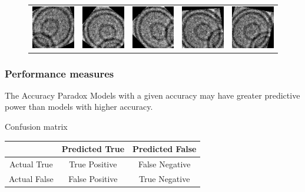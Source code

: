 \documentclass{beamer}
\begin{document}
\begin{frame}
\begin{figure}
\begin{tabular}{ccccc}
\includegraphics[scale=0.5]{augmented/_0_7140.jpeg} & \includegraphics[scale=0.5]{augmented/_0_7746.jpeg} & \includegraphics[scale=0.5]{augmented/_0_8553.jpeg} & \includegraphics[scale=0.5]{augmented/_0_8763.jpeg} & \includegraphics[scale=0.5]{augmented/_0_9361.jpeg} 
	
\end{tabular}
\end{figure}
\end{frame}

%
%

\begin{frame}
\frametitle{Performance measures}

\begin{block}{The Accuracy Paradox}
Models with a given accuracy may have greater predictive power than models with higher accuracy.
\end{block}

\begin{block}{Confusion matrix}
\begin{table}
\begin{tabular}{|c|c|c|}
\hline 
 & Predicted True & Predicted False \\ 
\hline 
Actual True & True Positive & False Negative \\ 
\hline 
Actual False & False Positive & True Negative \\ 
\hline 
\end{tabular} 
\end{table}
\end{block}


\end{frame}
\end{document}
